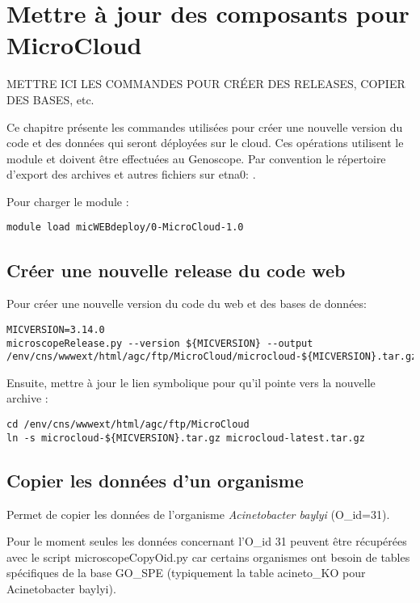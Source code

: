 \chapter{Mettre à jour des composants pour MicroCloud} \label{chap:creer_nouvelle_version}

\begin{mycolorbox}
	METTRE ICI LES COMMANDES POUR CRÉER DES RELEASES, COPIER DES BASES, etc.
\end{mycolorbox}

Ce chapitre présente les commandes utilisées pour créer une nouvelle version
du code et des données qui seront déployées sur le cloud.
Ces opérations utilisent le module \micWEBdeployVer
et doivent être effectuées au Genoscope.
Par convention le répertoire d'export des archives et autres fichiers sur etna0: .

Pour charger le module \micWEBdeployVer:
\begin{lstlisting}[style=bash]
module load micWEBdeploy/0-MicroCloud-1.0
\end{lstlisting}

\section{Créer une nouvelle release du code web}

Pour créer une nouvelle version du code du web et des bases de données:
\begin{lstlisting}[style=bash]
MICVERSION=3.14.0
microscopeRelease.py --version ${MICVERSION} --output /env/cns/wwwext/html/agc/ftp/MicroCloud/microcloud-${MICVERSION}.tar.gz
\end{lstlisting}

Ensuite, mettre à jour le lien symbolique pour qu'il pointe vers la nouvelle archive :
\begin{lstlisting}[style=bash]
cd /env/cns/wwwext/html/agc/ftp/MicroCloud
ln -s microcloud-${MICVERSION}.tar.gz microcloud-latest.tar.gz
\end{lstlisting}

\section{Copier les données d'un organisme}

Permet de copier les données de l'organisme \textit{Acinetobacter baylyi} (O\_id=31).

\begin{mycolorbox}
	Pour le moment seules les données concernant l'O\_id 31 peuvent être récupérées avec le script microscopeCopyOid.py car certains organismes ont besoin de tables spécifiques de la base GO\_SPE (typiquement la table acineto\_KO pour Acinetobacter baylyi).
\end{mycolorbox}

